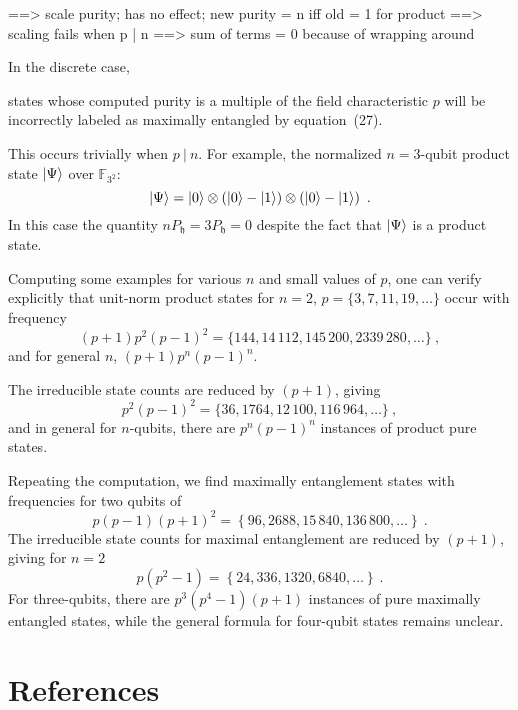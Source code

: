 \documentclass{iopart}
\newcommand{\ff}[1]{\mathbb{F}_{#1}}
\def\fh{\mathfrak{h}}
\begin{document}
==> scale purity; has no effect; new purity = n iff old = 1 for product
==> scaling fails when p | n
==> sum of terms = 0 because of wrapping around




In the discrete case,




states whose computed purity is a multiple of the field characteristic $p$ will be
incorrectly labeled as maximally entangled by equation~(27). 



This occurs trivially when $p ~|~ n$. For example,
the normalized $n=3$-qubit product state $\ket{\Psi}$ over $\ff{3^{2}}$:
\[
\ket{\Psi}=\ket{0}\otimes\left(\ket{0}-\ket{1}\right)\otimes\left(\ket{0}-\ket{1}\right)\textrm{ .}
\]
In this case the quantity $n P_{\fh} = 3 P_{\fh} = 0$ despite the fact that $\ket{\Psi}$ is a product state. 





Computing some examples for various $n$ and small values of $p$,
one can verify explicitly that unit-norm product states for $n=2$,
$p=\{3,7,11,19,\ldots\}$ occur with frequency 
\[
(p+1)p^{2}(p-1)^{2}=\{144,14\,112,145\,200,2339\,280,\ldots\}\ ,
\]
and for general $n$, $(p+1)p^{n}(p-1)^{n}$.

The irreducible state counts are reduced by $(p+1)$, giving 
\[
p^{2}(p-1)^{2}=\{36,1764,12\,100,116\,964,\ldots\}\ ,
\]
and in general for $n$-qubits, there are $p^{n}\left(p-1\right)^{n}$
instances of product pure states.

Repeating the computation, we find maximally entanglement states with
frequencies for two qubits of 
\[
p\left(p-1\right)\left(p+1\right)^{2}=\left\{ 96,2688,15\,840,136\,800,\ldots\right\} \ .
\]
The irreducible state counts for maximal entanglement are reduced
by $\left(p+1\right)$, giving for $n=2$ 
\[
p\left(p^{2}-1\right)=\left\{ 24,336,1320,6840,\ldots\right\} \ .
\]
For three-qubits, there are $p^{3}\left(p^{4}-1\right)\left(p+1\right)$
instances of pure maximally entangled states, while the general formula
for four-qubit states remains unclear.



\section*{References}

{}



\end{document}
